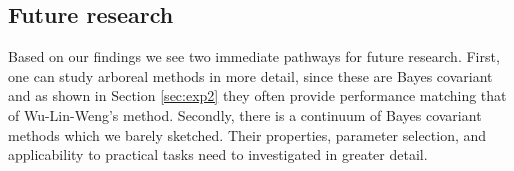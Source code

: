 \subsection{Future research}

Based on our findings we see two immediate pathways for future research. First, one can study arboreal methods in more detail, since these are Bayes covariant and as shown in Section \ref{sec:exp2} they often provide performance matching that of Wu-Lin-Weng's method. Secondly, there is a continuum of Bayes covariant methods which we barely sketched. Their properties, parameter selection,  and applicability to practical tasks need to investigated in greater detail.



%
%
%
%
%
